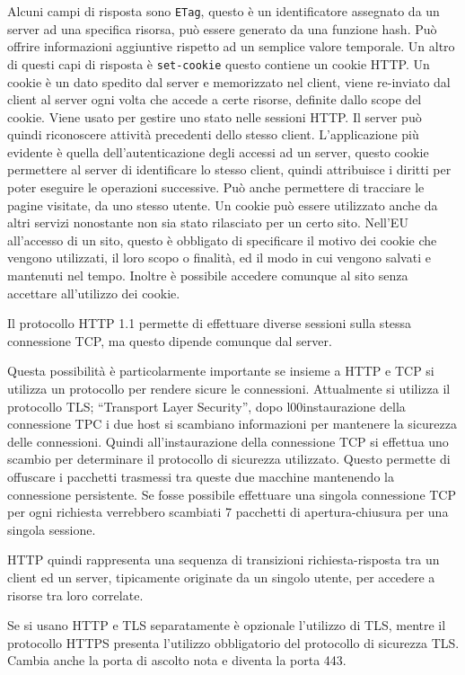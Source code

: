 \documentclass{article}
\numberwithin{equation}{subsection}
\begin{document}
Alcuni campi di risposta sono \verb|ETag|, questo è un identificatore assegnato da un server ad una specifica risorsa, può essere generato da una funzione hash. Può 
offrire informazioni aggiuntive rispetto ad un semplice valore temporale. 
Un altro di questi capi di risposta è \verb|set-cookie| questo contiene un cookie HTTP. 
Un cookie è un dato spedito dal server e memorizzato nel client, viene re-inviato dal client al server ogni volta che accede a certe risorse, definite dallo scope del cookie. 
Viene usato per gestire uno stato nelle sessioni HTTP. Il server può quindi riconoscere attività precedenti dello stesso client. 
L'applicazione più evidente è quella dell'autenticazione degli accessi ad un server, questo cookie permettere al server di identificare lo stesso client, quindi attribuisce 
i diritti per poter eseguire le operazioni successive. 
Può anche permettere di tracciare le pagine visitate, da uno stesso utente. Un cookie può essere utilizzato anche da altri servizi nonostante non sia stato rilasciato per 
un certo sito. Nell'EU all'accesso di un sito, questo è obbligato di specificare il motivo dei cookie che vengono utilizzati, il loro scopo o finalità, ed il modo in cui 
vengono salvati e mantenuti nel tempo. Inoltre è possibile accedere comunque al sito senza accettare all'utilizzo dei cookie. 

Il protocollo HTTP 1.1 permette di effettuare diverse sessioni sulla stessa 
connessione TCP, ma questo dipende comunque dal server. 

Questa possibilità è particolarmente importante se insieme a HTTP e TCP si 
utilizza un protocollo per rendere sicure le connessioni. Attualmente si utilizza il 
protocollo TLS; ``Transport Layer Security'', dopo l00instaurazione della 
connessione TPC i due host si scambiano informazioni per mantenere la sicurezza delle connessioni. Quindi all'instaurazione della connessione TCP si effettua uno 
scambio per determinare il protocollo di sicurezza utilizzato. Questo permette di offuscare i pacchetti trasmessi tra queste due macchine mantenendo la connessione 
persistente. 
Se fosse possibile effettuare una singola connessione TCP per ogni richiesta verrebbero scambiati 7 pacchetti di apertura-chiusura per una singola sessione. 

HTTP quindi rappresenta una sequenza di transizioni richiesta-risposta tra un client ed un server, tipicamente originate da un singolo utente, per accedere 
a risorse tra loro correlate. 

Se si usano HTTP e TLS separatamente è opzionale l'utilizzo di TLS, mentre il protocollo HTTPS presenta l'utilizzo obbligatorio del protocollo di sicurezza 
TLS. Cambia anche la porta di ascolto nota e diventa la porta 443. 
\end{document}
